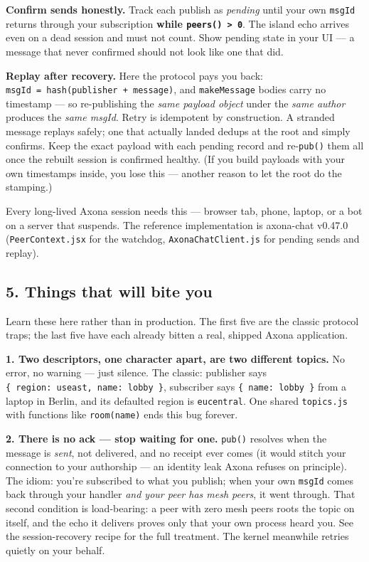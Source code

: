 \documentclass[
  nobib]{tufte-handout}
\begin{document}
\textbf{Confirm sends honestly.} Track each publish as \emph{pending}
until your own \texttt{msgId} returns through your subscription
\textbf{while \texttt{peers()\ \textgreater{}\ 0}}. The island echo
arrives even on a dead session and must not count. Show pending state in
your UI --- a message that never confirmed should not look like one that
did.

\textbf{Replay after recovery.} Here the protocol pays you back:
\texttt{msgId\ =\ hash(publisher\ +\ message)}, and \texttt{makeMessage}
bodies carry no timestamp --- so re-publishing the \emph{same payload
object} under the \emph{same author} produces the \emph{same msgId}.
Retry is idempotent by construction. A stranded message replays safely;
one that actually landed dedups at the root and simply confirms. Keep
the exact payload with each pending record and re-\texttt{pub()} them
all once the rebuilt session is confirmed healthy. (If you build
payloads with your own timestamps inside, you lose this --- another
reason to let the root do the stamping.)

Every long-lived Axona session needs this --- browser tab, phone,
laptop, or a bot on a server that suspends. The reference implementation
is axona-chat v0.47.0 (\texttt{PeerContext.jsx} for the watchdog,
\texttt{AxonaChatClient.js} for pending sends and replay).

\subsection{5. Things that will bite
you}\label{things-that-will-bite-you}

Learn these here rather than in production. The first five are the
classic protocol traps; the last five have each already bitten a real,
shipped Axona application.

\textbf{1. Two descriptors, one character apart, are two different
topics.} No error, no warning --- just silence. The classic: publisher
says
\texttt{\{\ region:\ \textquotesingle{}useast\textquotesingle{},\ name:\ \textquotesingle{}lobby\textquotesingle{}\ \}},
subscriber says
\texttt{\{\ name:\ \textquotesingle{}lobby\textquotesingle{}\ \}} from a
laptop in Berlin, and its defaulted region is \texttt{eucentral}. One
shared \texttt{topics.js} with functions like \texttt{room(name)} ends
this bug forever.

\textbf{2. There is no ack --- stop waiting for one.} \texttt{pub()}
resolves when the message is \emph{sent}, not delivered, and no receipt
ever comes (it would stitch your connection to your authorship --- an
identity leak Axona refuses on principle). The idiom: you're subscribed
to what you publish; when your own \texttt{msgId} comes back through
your handler \emph{and your peer has mesh peers}, it went through. That
second condition is load-bearing: a peer with zero mesh peers roots the
topic on itself, and the echo it delivers proves only that your own
process heard you. See the session-recovery recipe for the full
treatment. The kernel meanwhile retries quietly on your behalf.
\end{document}

